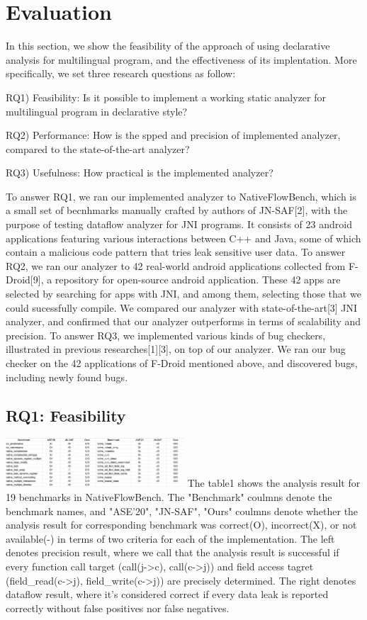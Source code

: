 \section{Evaluation}
In this section, we show the feasibility of the approach of using declarative
analysis for multilingual program, and the effectiveness of its
implentation. More specifically, we set three research questions as follow:

RQ1) Feasibility: Is it possible to implement a working static analyzer for multilingual program in declarative style?

RQ2) Performance: How is the spped and precision of implemented analyzer, compared to the state-of-the-art analyzer?

RQ3) Usefulness: How practical is the implemented analyzer?

To answer RQ1, we ran our implemented analyzer to NativeFlowBench, which is a
small set of becnhmarks manually crafted by authors of JN-SAF[2], with the
purpose of testing dataflow analyzer for JNI programs. It consists of 23
android applications featuring various interactions between C++ and Java, some
of which contain a malicious code pattern that tries leak sensitive user data.
To answer RQ2, we ran our analyzer to 42 real-world android applications
collected from F-Droid[9], a repository for open-source android application. These
42 apps are selected by searching for apps with JNI, and among them, selecting those
that we could sucessfully compile. We compared our analyzer with
state-of-the-art[3] JNI analyzer, and confirmed that our analyzer outperforms
in terms of scalability and precision. To answer RQ3, we implemented various
kinds of bug checkers, illustrated in previous researches[1][3], on top of our
analyzer. We ran our bug checker on the 42 applications of F-Droid mentioned
above, and discovered  bugs, including  newly found bugs.


\subsection{RQ1: Feasibility}
\includegraphics[width=0.5\textwidth]{img/table1}
The table1 shows the analysis result for 19 benchmarks in NativeFlowBench.  The
"Benchmark" coulmns denote the benchmark names, and "ASE'20", "JN-SAF", "Ours"
coulmns denote whether the analysis result for corresponding benchmark was
correct(O), incorrect(X), or not available(-) in terms of two criteria for each
of the implementation.  The left denotes precision result, where we call that
the analysis result is successful if every function call target (call(j->c),
call(c->j)) and field access tagret (field\_read(c->j), field\_write(c->j)) are
precisely determined. The right denotes dataflow result, where it's considered
correct if every data leak is reported correctly without false positives nor
false negatives. 

